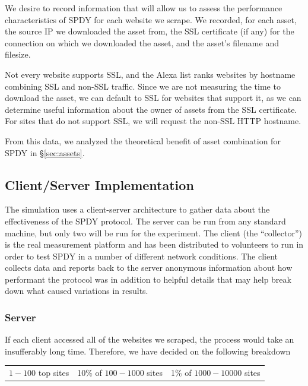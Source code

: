 \documentclass[10pt,letterpaper,notitlepage]{article}
\begin{document}
We desire to record information that will allow us to assess the performance
characteristics of SPDY for each website we scrape. We recorded, for each
asset, the source IP we downloaded the asset from, the SSL certificate (if any)
for the connection on which we downloaded the asset, and the asset's filename
and filesize.

Not every website supports SSL, and the Alexa list ranks websites by hostname
combining SSL and non-SSL traffic. Since we are not measuring the time to
download the asset, we can default to SSL for websites that support it, as we
can determine useful information about the owner of assets from the SSL
certificate. For sites that do not support SSL, we will request the non-SSL
HTTP hostname.

From this data, we analyzed the theoretical benefit of asset combination for
SPDY in \S\ref{sec:assets}.

\subsection{Client/Server Implementation}
\label{sec:research/client-server}
The simulation uses a client-server architecture to gather data about the
effectiveness of the SPDY protocol. The server can be run from any standard
machine, but only two will be run for the experiment.  The client (the
``collector'') is the real measurement platform and has been distributed to
volunteers to run in order to test SPDY in a number of different network
conditions.  The client collects data and reports back to the server
anonymous information about how performant the protocol was in addition to
helpful details that may help break down what caused variations in results.
\subsubsection{Server}
\label{sec:research/server}
If each client accessed all of the websites we scraped, the process would take
an insufferably long time.  Therefore, we have decided on the following
breakdown
\begin{center}
\begin{tabular}{ccc}
$1-100$ top sites & 10\% of $100-1000$ sites & 1\% of $1000-10000$ sites \\
\end{tabular}
\end{center}
\end{document}
